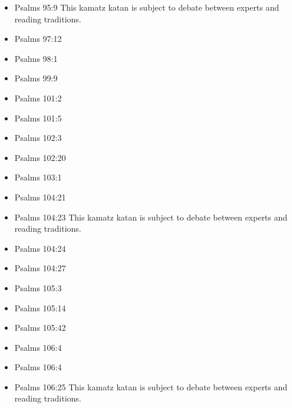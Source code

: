 \documentclass[14pt]{book}
\begin{document}
\begin{multicols}{2}
\begin{itemize}
					\item Psalms 95:9 This kamatz katan is subject to debate between experts and reading traditions.
					
					\item Psalms 97:12
					
					\item Psalms 98:1
					
					\item Psalms 99:9
					
					\item Psalms 101:2
					
					\item Psalms 101:5
					
					\item Psalms 102:3
					
					\item Psalms 102:20
					
					\item Psalms 103:1
					
					\item Psalms 104:21
					
					\item Psalms 104:23 This kamatz katan is subject to debate between experts and reading traditions.
					
					\item Psalms 104:24
					
					\item Psalms 104:27
					
					\item Psalms 105:3
					
					\item Psalms 105:14
			
					
					\item Psalms 105:42
					
					\item Psalms 106:4
					
					\item Psalms 106:4
					
					\item Psalms 106:25 This kamatz katan is subject to debate between experts and reading traditions.
					

\end{itemize}
\end{multicols}
\end{document}
